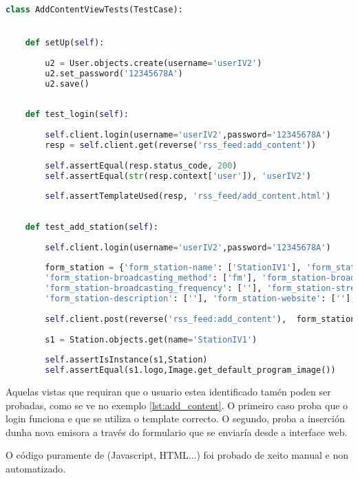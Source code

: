 \begin{lstlisting}[language=Python, caption=Fragmento das probas da vista add\_content, label=lst:add_content]
class AddContentViewTests(TestCase):


	def setUp(self):
	
		u2 = User.objects.create(username='userIV2')
		u2.set_password('12345678A')
		u2.save()
	
	
	def test_login(self):
	
		self.client.login(username='userIV2',password='12345678A')
		resp = self.client.get(reverse('rss_feed:add_content'))
		
		self.assertEqual(resp.status_code, 200)
		self.assertEqual(str(resp.context['user']), 'userIV2')
		
		self.assertTemplateUsed(resp, 'rss_feed/add_content.html')
	
	
	def test_add_station(self):
	
		self.client.login(username='userIV2',password='12345678A')
		
		form_station = {'form_station-name': ['StationIV1'], 'form_station-logo': [''], 'form_station-profile_img': [''], 
		'form_station-broadcasting_method': ['fm'], 'form_station-broadcasting_area': [''], 
		'form_station-broadcasting_frequency': [''], 'form_station-streaming_link': [''], 
		'form_station-description': [''], 'form_station-website': [''], 'form_station-location': ['']}
		
		self.client.post(reverse('rss_feed:add_content'),  form_station)
		
		s1 = Station.objects.get(name='StationIV1')
		
		self.assertIsInstance(s1,Station)
		self.assertEqual(s1.logo,Image.get_default_program_image())
\end{lstlisting}


Aquelas vistas que requiran que o usuario estea identificado tamén poden ser probadas, como se ve no exemplo \ref{lst:add_content}. O primeiro caso proba que o login funciona e que se utiliza o template correcto. O segundo, proba a inserción dunha nova emisora a través do formulario que se enviaría desde a interface web.

O código puramente de  (Javascript, HTML...) foi probado de xeito manual e non automatizado.
